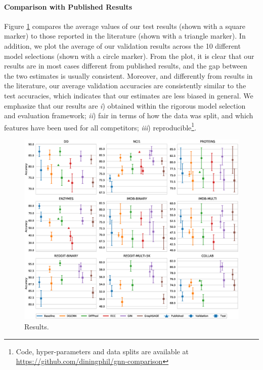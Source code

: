 \paragraph{Comparison with Published Results}
Figure \ref{fig:comparison-plot} compares the average values of our test results (shown with a square marker) to those reported in the literature (shown with a triangle marker). In addition, we plot the average of our validation results across the 10 different model selections (shown with a circle marker). From the plot, it is clear that our results are in most cases different from published results, and the gap between the two estimates is usually consistent. Moreover, and differently from results in the literature, our average validation accuracies are consistently similar to the test accuracies, which indicates that our estimates are less biased in general. We emphasize that our results are \emph{i}) obtained within the rigorous model selection and evaluation framework; \emph{ii}) fair in terms of how the data was split, and which features have been used for all competitors; \emph{iii}) reproducible\footnote{Code, hyper-parameters and data splits are available at \url{https://github.com/diningphil/gnn-comparison}}.

\begin{figure}[h!]
    \centering
    \includegraphics[width=\linewidth]{Figures/Chapter4/07-comparison-results.eps}
    \caption{Results.}
    \label{fig:comparison-plot}
\end{figure}


